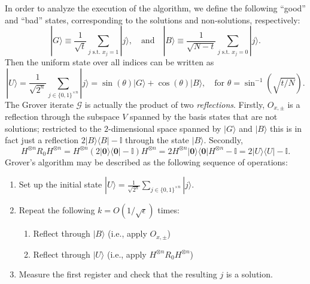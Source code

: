 \documentclass[12pt,oneside]{amsart}
\theoremstyle{plain}%
\theoremstyle{definition}
\theoremstyle{remark}
\begin{document}
In order to analyze the execution of the algorithm, we define the following ``good'' and ``bad'' states, corresponding to the solutions and non-solutions, respectively:
\begin{equation}
  |G\rangle \equiv  \frac{1}{\sqrt{t}}\sum_{\text{$j$ s.t. $x_j=1$}}|j\rangle, \quad\text{and}\quad |B\rangle \equiv  \frac{1}{\sqrt{N-t}}\sum_{\text{$j$ s.t. $x_j=0$}}|j\rangle.
\end{equation}
Then the uniform state over all indices can be written as
\begin{equation}
  |U\rangle = \frac{1}{\sqrt{2^n}}\sum_{j\in \{0,1\}^{\times n}} |j\rangle = \sin(\theta)|G\rangle + \cos(\theta)|B\rangle, \quad \text{for $\theta= \sin^{-1}\left(\sqrt{t/N}\right)$.}
\end{equation} 
The Grover iterate $\mathcal{G}$ is actually the product of two \emph{reflections}. Firstly, $O_{x,\pm}$ is a reflection through the subspace $V$ spanned by the basis states that are not solutions; restricted to the $2$-dimensional space spanned by $|G\rangle$ and $|B\rangle$ this is in fact just a reflection $2|B\rangle\langle B|-\mathbb{I}$ through the state $|B\rangle$. Secondly,
\begin{equation}
  H^{\otimes n}R_0H^{\otimes n} = H^{\otimes n}(2|\mathbf{0}\rangle\langle \mathbf{0}|-\mathbb{I})H^{\otimes n} = 2 H^{\otimes n}|\mathbf{0}\rangle\langle \mathbf{0}|H^{\otimes n}-\mathbb{I} = 2|U\rangle\langle U|-\mathbb{I}.
\end{equation} 
Grover's algorithm may be described as the following sequence of operations:
\begin{enumerate}
  \item Set up the initial state $|U\rangle = \frac{1}{\sqrt{2^n}}\sum_{j\in \{0,1\}^{\times n}} |j\rangle$.
  \item Repeat the following $k=O(1/\sqrt{\epsilon})$ times:
  \begin{enumerate}
    \item Reflect through $|B\rangle$ (i.e., apply $O_{x,\pm}$)
    \item Reflect through $|U\rangle$ (i.e., apply $H^{\otimes n}R_0H^{\otimes n}$)
  \end{enumerate}
  \item Measure the first register and check that the resulting $j$ is a solution.
\end{enumerate} 
\end{document}
